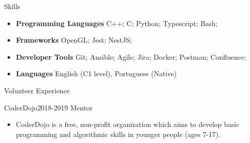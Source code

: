 \documentclass[]{mcdowellcv}
\begin{document}
	\begin{cvsection}{Skills}
		\begin{cvsubsection}{}{}{}
			\begin{itemize}
				\item \textbf{Programming Languages} C++; C; Python; Typescript; Bash;
				\item \textbf{Frameworks} OpenGL; Jest; NestJS;
				\item \textbf{Developer Tools} Git; Ansible; Agile; Jira; Docker; Postman; Confluence;
			    \item \textbf{Languages} English (C1 level), Portuguese (Native)
			\end{itemize}
		\end{cvsubsection}
	\end{cvsection}
 	\begin{cvsection}{Volunteer Experience}
		\begin{cvsubsection}{CoderDojo}{}{2018-2019}
            Mentor
			\begin{itemize}
				\item CoderDojo is a free, non-profit organization which aims to develop basic programming and algorithmic skills in younger people (ages 7-17).
			\end{itemize}
		\end{cvsubsection}
	\end{cvsection}
\end{document}
